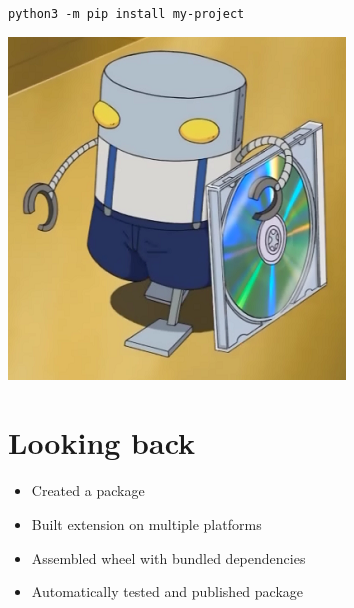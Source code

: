 \documentclass[pdf]{beamer}
\begin{document}
\begin{frame}
    \inputminted[firstline = 24, lastline = 28]{yaml}{travis.yml}
\end{frame}

\begin{frame}[fragile]
    \inputminted[firstline = 30, lastline = 36]{yaml}{travis.yml}
\end{frame}

\begin{frame}[fragile]
    \texttt{python3 -m pip install my-project}
\end{frame}

\begin{frame}
    \begin{center}
        \includegraphics[height = 0.8\textheight]{img/mechazawa-dist.png}
    \end{center}
\end{frame}

\section{Looking back}

\begin{frame}
    \begin{itemize}[<+->]
        \item Created a package
        \item Built extension on multiple platforms
        \item Assembled wheel with bundled dependencies
        \item Automatically tested and published package
    \end{itemize}
\end{frame}
\end{document}
